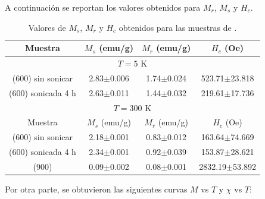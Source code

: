 \documentclass[../main.tex]{subfiles}
\begin{document}
A continuación se reportan los valores obtenidos para $M_r$, $M_s$ y $H_c$.
\begin{table}[H]
    \centering
    \begin{tabular}{|c||c|c|c|}
        \hline 
        Muestra & $M_s$ (emu/g) & $M_r$ (emu/g) & $H_c$ (Oe) \\
        \hline
        \hline
        \multicolumn{4}{|c|}{$T=5$ K} \\
        \hline
        \neod{} (600\gradoC{}) sin sonicar & 2.83$\pm$0.006 & 1.74$\pm$0.024 & 523.71$\pm$23.818 \\
        \hline
        \neod{} (600\gradoC{}) sonicada 4 h & 2.63$\pm$0.011 & 1.44$\pm$0.032 & 219.61$\pm$17.736 \\
        \hline
        \multicolumn{4}{|c|}{$T=300$ K} \\
        \hline 
        Muestra & $M_s$ (emu/g) & $M_r$ (emu/g) & $H_c$ (Oe) \\
        \hline
        \hline
        \neod{} (600\gradoC{}) sin sonicar & 2.18$\pm$0.001 & 0.83$\pm$0.012 & 163.64$\pm$74.669 \\
        \hline
        \neod{} (600\gradoC{}) sonicada 4 h & 2.34$\pm$0.001 & 0.92$\pm$0.039 & 153.87$\pm$28.621 \\
        \hline
        \neod{} (900\gradoC{}) & 0.09$\pm$0.002 & 0.08$\pm$0.001 & 2832.19$\pm$53.892 \\
        \hline
        \end{tabular} 
    \caption{Valores de $M_s$, $M_r$ y $H_c$ obtenidos para las muestras de \neod{}.}
    \label{tabla:resmvshneod}
\end{table}
Por otra parte, se obtuvieron las siguientes curvas $M$ vs $T$ y $\chi$ vs $T$:
\end{document}
